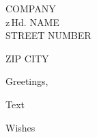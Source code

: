 \documentclass[
    test,
    paper=a4,
    version=last,
    fontsize=10pt,
    DIV=13,
    BCOR=0mm]{scrlttr2}
\begin{document}
\begin{letter}
    {
        COMPANY \\
        z\,Hd. NAME \\
        STREET NUMBER \par
        ZIP CITY
    }
    
    \opening{Greetings,}
    
    Text
    
    \closing{Wishes}
    \end{letter}
\end{document}
